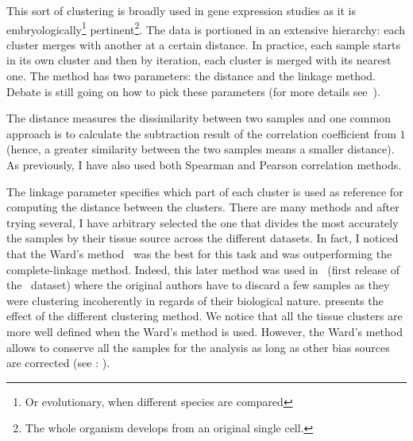 This sort of clustering is broadly used in gene expression studies as it is
embryologically\footnote{Or evolutionary, when different species are compared}
pertinent\footnote{The whole organism develops from
an original single cell.}. The data is portioned in an extensive hierarchy:
each cluster merges with another at a certain distance.
In practice, each sample starts in its own cluster and then
by iteration, each cluster is merged with its nearest one.
The method has two parameters: the distance and the linkage method.
Debate is still going on how to pick these parameters (for more details
see~).

The distance measures the dissimilarity between two samples and one common
approach is to calculate the subtraction result of
the correlation coefficient from $1$ (hence, a greater similarity between the two
samples means a smaller distance). As previously, I have also used both Spearman
and Pearson correlation methods.

The linkage parameter specifies which part of each cluster is used as reference
for computing the distance between the clusters. There are many methods and after
trying several, I have arbitrary selected the one that divides the most accurately
the samples by their tissue source across the different datasets.
In fact, I noticed that the Ward's method~
was the best for this task and was outperforming the complete-linkage method.
Indeed, this later method was used in~
(first release of the \uhlen\ dataset) where
the original authors have to discard a few samples as they were clustering
incoherently in regards of their biological nature.
 presents the effect of the different clustering
method.
We notice that all the tissue clusters are more well defined when the Ward's
method is used.
However, the Ward's method allows to conserve all the samples for the analysis
as long as other bias sources are corrected (see : ).

